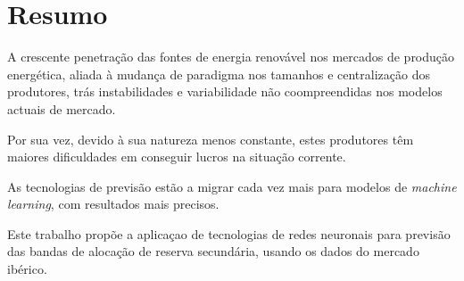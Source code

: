 \chapter{Resumo}
\par{A crescente penetração das fontes de energia renovável nos mercados de produção energética, aliada à mudança de paradigma nos tamanhos e centralização dos produtores, trás instabilidades e variabilidade não coompreendidas nos modelos actuais de mercado.}
\par{Por sua vez, devido à sua natureza menos constante, estes produtores têm maiores dificuldades em conseguir lucros na situação corrente.}
\par{As tecnologias de previsão estão a migrar cada vez mais para modelos de \emph{machine learning}, com resultados mais precisos.}
\par{Este trabalho propõe a aplicaçao de tecnologias de redes neuronais para previsão das bandas de alocação de reserva secundária, usando os dados do mercado ibérico.}

\vspace{0.5cm} %


